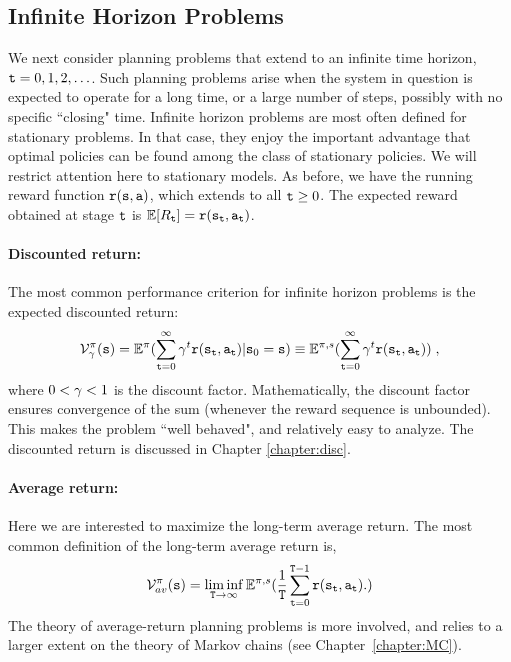 \subsection{Infinite Horizon Problems}
We next consider planning problems that extend to an infinite time
horizon, ${\tt t} = 0,1,2, \ldots $. Such planning problems arise
when the system in question is expected to operate for a long time,
or a large number of steps, possibly with no specific ``closing"
time. Infinite horizon problems are most often defined for
stationary problems. In that case, they enjoy the important
advantage that optimal policies can be found among the class of
stationary policies.  We will restrict attention here to stationary
models. As before, we have the running reward function
${\tt r}({\tt s},{\tt a})$, which extends to all ${\tt t}\ge 0$. The
expected reward obtained at stage ${\tt t}$ is $\mathbb{E}[{R_{\tt t}}] =
{\tt r}({{\tt s}_{\tt t}},{{\tt a}_{\tt t}})$.

\paragraph{Discounted return:} The most common performance criterion for infinite horizon problems is the expected discounted return:
\[\mathcal{V}_\gamma ^\pi ({\tt s}) = {\mathbb{E}^\pi }(\sum\limits_{{\tt t} = 0}^\infty  {{\gamma^t}{\tt r}({{\tt s}_{\tt t}},{{\tt a}_{\tt t}})} |{{\tt s}_0} = {\tt s}) \equiv {\ensuremath{\mathbb{E}}^{\pi,s}}(\sum\limits_{{\tt t} = 0}^\infty  {{\gamma^t}{\tt r}({{\tt s}_{\tt t}},{{\tt a}_{\tt t}})} )\;,\]
where $0 < \gamma  < 1$ is the discount factor. Mathematically,
the discount factor ensures convergence of the sum (whenever the
reward sequence is unbounded). This makes the problem ``well behaved",
and relatively easy to analyze. The discounted return is discussed
in Chapter \ref{chapter:disc}.

\paragraph{Average return:}  Here we are interested to maximize the long-term average return. The most common definition of the long-term average return is,
\[\mathcal{V}_{av}^\pi ({\tt s}) = \mathop {\lim \inf }\limits_{{\tt T} \to \infty } {\mathbb{E}^{\pi ,s}}(\frac{1}{{\tt T}}\sum\limits_{{\tt t} = 0}^{{\tt T} -1} {{\tt r}({{\tt s}_{\tt t}},{{\tt a}_{\tt t}})}. )\]
The theory of average-return planning problems is more involved, and
relies to a larger extent on the theory of Markov chains (see
Chapter~\ref{chapter:MC}). 



